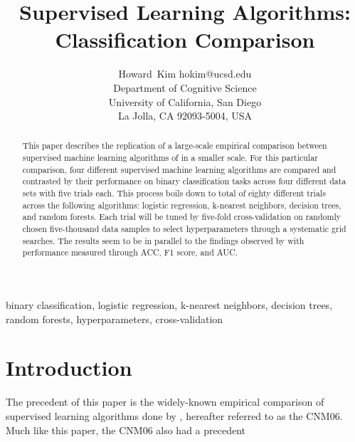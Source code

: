 \documentclass[twoside,11pt]{article}
\begin{document}
\title{Supervised Learning Algorithms: Classification Comparison}

\author{\name Howard\ Kim \email hokim@ucsd.edu \\
       \addr Department of Cognitive Science\\
       University of California, San Diego\\
       La Jolla, CA 92093-5004, USA}
       

\maketitle

\begin{abstract}%
This paper describes the replication of a large-scale empirical 
comparison between supervised machine learning algorithms of \citet{cnm06} 
in a smaller scale.  For this particular comparison, four different 
supervised machine learning algorithms are compared and contrasted by their 
performance on binary classification tasks across four different data sets 
with five trials each.  This process boils down to total of eighty different 
trials across the following algorithms: logistic regression, k-nearest 
neighbors, decision trees, and random forests.  Each trial will be tuned by 
five-fold cross-validation on randomly chosen five-thousand data samples to 
select hyperparameters through a systematic grid searches. The results  
seem to be in parallel to the findings observed by \citet{cnm06} with 
performance measured through ACC, F1 score, and AUC.
\end{abstract}

\begin{keywords}
  binary classification, logistic regression, k-nearest neighbors, decision 
  trees, random forests, hyperparameters, cross-validation
  \\
\end{keywords}

\section{Introduction}

The precedent of this paper is the widely-known empirical comparison of 
supervised learning algorithms done by \cite{cnm:06}, hereafter referred 
to as the CNM06. Much like this paper, the CNM06 also had a precedent 
\end{document}
